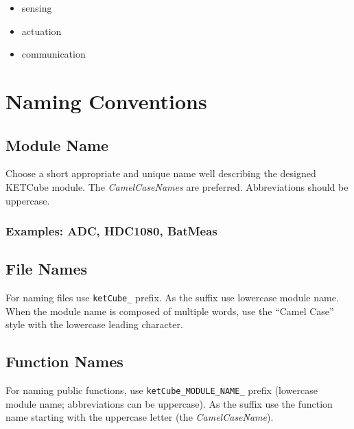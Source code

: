 \begin{itemize}
  \item sensing
  \item actuation
  \item communication
\end{itemize}


\setcounter{tocdepth}{1}
\tableofcontents
\clearpage

\listoffigures
\listoftables
\begin{versionhistory}
\end{versionhistory}
\setcounter{table}{0}

\clearpage 
{} 
\pagestyle{headings} 

\clearpage
\section{Naming Conventions}
\subsection*{Module Name}
Choose a short appropriate and unique name well describing the designed KETCube module. The {\it CamelCaseNames} are preferred. Abbreviations should be uppercase.
\subsubsection*{Examples: ADC, HDC1080, BatMeas}

\subsection*{File Names}
For naming files use {\tt ketCube\_} prefix. As the suffix use lowercase module name. When the module name is composed of multiple words, use the ``Camel Case'' style with the lowercase leading character.


\subsection*{Function Names}
For naming public functions, use {\tt ketCube\_MODULE\_NAME\_} prefix (lowercase module name; abbreviations can be uppercase). As the suffix use the function name starting with the uppercase letter (the {\it CamelCaseName}).

